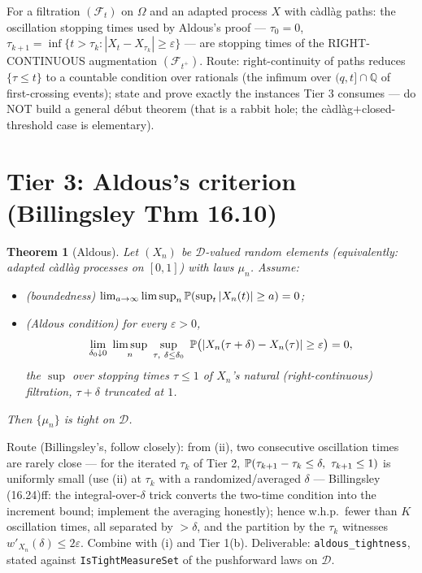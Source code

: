 \documentclass[11pt]{article}
\theoremstyle{plain}
\newtheorem{theorem}{Theorem}
\theoremstyle{remark}
\newcommand{\D}{\mathcal D}
\newcommand{\F}{\mathcal F}\newcommand{\Q}{\mathbb Q}\newcommand{\eps}{\varepsilon}
\begin{document}
For a filtration $(\F_t)$ on $\Omega$ and an adapted process $X$ with
c\`adl\`ag paths: the oscillation stopping times used by Aldous's proof ---
$\tau_0=0$, $\tau_{k+1}=\inf\{t>\tau_k:|X_t-X_{\tau_k}|\ge\eps\}$ --- are
stopping times of the RIGHT-CONTINUOUS augmentation $(\F_{t^+})$. Route:
right-continuity of paths reduces $\{\tau\le t\}$ to a countable condition
over rationals (the infimum over $(q,t]\cap\Q$ of first-crossing events);
state and prove exactly the instances Tier 3 consumes --- do NOT build a
general d\'ebut theorem (that is a rabbit hole; the c\`adl\`ag$+$closed-threshold
case is elementary).

\section*{Tier 3: Aldous's criterion (Billingsley Thm 16.10)}

\begin{theorem}[Aldous]
Let $(X_n)$ be $\D$-valued random elements (equivalently: adapted c\`adl\`ag
processes on $[0,1]$) with laws $\mu_n$. Assume:
\begin{itemize}
\item[(i)] \textup{(boundedness)}
$\lim_{a\to\infty}\limsup_n\mathbb{P}(\sup_t|X_n(t)|\ge a)=0$;
\item[(ii)] \textup{(Aldous condition)} for every $\eps>0$,
\[
  \lim_{\delta_0\downarrow0}\ \limsup_n\
  \sup_{\tau,\ \delta\le\delta_0}\ \PP\big(|X_n(\tau+\delta)-X_n(\tau)|\ge\eps\big)=0,
\]
the $\sup$ over stopping times $\tau\le1$ of $X_n$'s natural (right-continuous)
filtration, $\tau+\delta$ truncated at $1$.
\end{itemize}
Then $\{\mu_n\}$ is tight on $\D$.
\end{theorem}

\noindent Route (Billingsley's, follow closely): from (ii), two consecutive
oscillation times are rarely close --- for the iterated $\tau_k$ of Tier 2,
$\PP(\tau_{k+1}-\tau_k\le\delta,\ \tau_{k+1}\le1)$ is uniformly small (use
(ii) at $\tau_k$ with a randomized/averaged $\delta$ --- Billingsley (16.24)ff:
the integral-over-$\delta$ trick converts the two-time condition into the
increment bound; implement the averaging honestly); hence w.h.p.\ fewer than
$K$ oscillation times, all separated by $>\delta$, and the partition by the
$\tau_k$ witnesses $w'_{X_n}(\delta)\le2\eps$. Combine with (i) and Tier 1(b).
Deliverable: \texttt{aldous\_tightness}, stated against
\texttt{IsTightMeasureSet} of the pushforward laws on $\D$.
\end{document}
